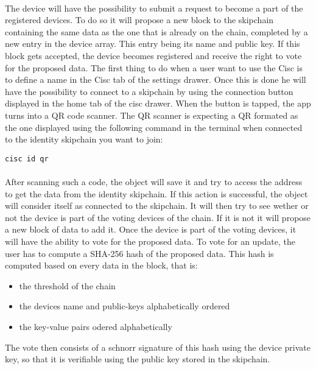 \paragraph{}
The device will have the possibility to submit a request to become a part of the registered devices. To do so it will propose a new block to the skipchain containing the same data as the one that is already on the chain, completed by a new entry in the device array. This entry being its name and public key. If this block gets accepted, the device becomes registered and receive the right to vote for the proposed data.
The first thing to do when a user want to use the Cisc is to define a name in the Cisc tab of the settings drawer. Once this is done he will have the possibility to connect to a skipchain by using the connection button displayed in the home tab of the cisc drawer. When the button is tapped, the app turns into a QR code scanner. The QR scanner is expecting a QR formated as the one displayed using the following command in the terminal when connected to the identity skipchain you want to join:
\begin{lstlisting}
cisc id qr
\end{lstlisting}

\paragraph{}
After scanning such a code, the object will save it and try to access the address to get the data from the identity skipchain. If this action is successful, the object will consider itself as connected to the skipchain. It will then try to see wether or not the device is part of the voting devices of the chain. If it is not it will propose a new block of data to add it.
Once the device is part of the voting devices, it will have the ability to vote for the proposed data.
To vote for an update, the user has to compute a SHA-256 hash of the proposed data. This hash is computed based on every data in the block, that is:
\begin{itemize}
  \item the threshold of the chain
  \item the devices name and public-keys alphabetically ordered
  \item the key-value pairs odered alphabetically
\end{itemize}
The vote then consists of a schnorr signature of this hash using the device private key, so that it is verifiable using the public key stored in the skipchain.

